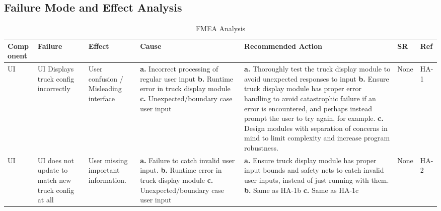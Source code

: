 \documentclass{article}
\begin{document}
\begin{landscape}

\section{Failure Mode and Effect Analysis}
\begin{table}[H]
    \caption{FMEA Analysis} \label{TblFMEA}
    \begin{tabular}{|p{} | p{} | p{} | p{} | p{} | p{} | p{}|}
    \toprule
    \textbf{Comp onent} & \textbf{Failure} & \textbf{Effect} & \textbf{Cause} & \textbf{Recommended Action} & \textbf{SR} & \textbf{Ref}\\
    \midrule
    UI & UI Displays truck config incorrectly & User confusion / Misleading interface
&   \textbf{a.} Incorrect processing of regular user input\newline
    \textbf{b.} Runtime error in truck display module\newline
    \textbf{c.} Unexpected/boundary case user input 
&   \textbf{a.} Thoroughly test the truck display module to avoid unexpected responses to input\newline
    \textbf{b.}  Ensure truck display module has proper error handling to avoid catastrophic failure if an error is encountered, and perhaps instead prompt the user to try again, for example.\newline
    \textbf{c.} Design modules with separation of concerns in mind to limit complexity and increase program robustness.
&None&HA-1\\
    \midrule
    UI & UI does not update to match new truck config at all & User missing important information. & \textbf{a.} Failure to catch invalid user input.\newline
    \textbf{b.} Runtime error in truck display module\newline
    \textbf{c.} Unexpected/boundary case user input 
&   \textbf{a.} Ensure truck display module has proper input bounds and safety nets to catch invalid user inputs, instead of just running with them.\newline
    \textbf{b.} Same as HA-1b\newline
    \textbf{c.} Same as HA-1c
&None&HA-2\\
    \bottomrule
  \end{tabular}
  \end{table}
\pagebreak
\begin{table}[H]

\end{table}
\end{landscape}
\end{document}
